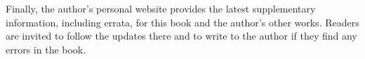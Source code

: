 Finally, the author's personal website provides the latest supplementary information, including errata, for this book and the author's other works. Readers are invited to follow the updates there and to write to the author if they find any errors in the book.
